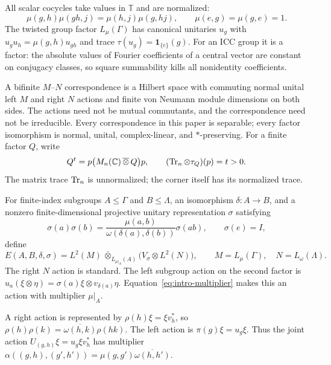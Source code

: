 All scalar cocycles take values in $\mathbb T$ and are normalized:
\[
 \mu(g,h)\mu(gh,j)=\mu(h,j)\mu(g,hj),\qquad
 \mu(e,g)=\mu(g,e)=1.
\]
The twisted group factor $L_\mu(\Gamma)$ has canonical unitaries $u_g$
with $u_gu_h=\mu(g,h)u_{gh}$ and trace
$\tau(u_g)=\mathbf1_{\{e\}}(g)$. For an ICC group it is a factor: the
absolute values of Fourier coefficients of a central vector are constant
on conjugacy classes, so square summability kills all nonidentity
coefficients.

A bifinite $M$--$N$ correspondence is a Hilbert space with commuting normal
unital left $M$ and right $N$ actions and finite von Neumann module
dimensions on both sides. The actions need not be mutual commutants, and
the correspondence need not be irreducible. Every correspondence in this
paper is separable; every factor isomorphism is normal, unital,
complex-linear, and $*$-preserving. For a finite factor $Q$, write
\[
 Q^t=p\bigl(M_n(\mathbb C)\,\overline\otimes\,Q\bigr)p,
 \qquad (\operatorname{Tr}_n\otimes\tau_Q)(p)=t>0.
\]
The matrix trace $\operatorname{Tr}_n$ is unnormalized; the corner itself has its
normalized trace.


For finite-index subgroups $A\leq\Gamma$ and $B\leq\Lambda$, an
isomorphism $\delta:A\to B$, and a nonzero finite-dimensional projective
unitary representation $\sigma$ satisfying
\begin{equation}\label{eq:intro-multiplier}
 \sigma(a)\sigma(b)
 =\frac{\mu(a,b)}{\omega(\delta(a),\delta(b))}\sigma(ab),
 \qquad \sigma(e)=I,
\end{equation}
define
\begin{equation}\label{eq:intro-model}
 E(A,B,\delta,\sigma)
 =L^2(M)\,\overline\otimes_{L_{\mu|_A}(A)}
       \bigl(V_\sigma\otimes L^2(N)\bigr),
 \qquad M=L_\mu(\Gamma),\quad N=L_\omega(\Lambda).
\end{equation}
The right $N$ action is standard. The left subgroup action on the second
factor is
$u_a(\xi\otimes\eta)=\sigma(a)\xi\otimes v_{\delta(a)}\eta$.
Equation~\eqref{eq:intro-multiplier} makes this an action with multiplier
$\mu|_A$.


A right action is represented by $\rho(h)\xi=\xi v_h^*$, so
$\rho(h)\rho(k)=\overline{\omega(h,k)}\rho(hk)$.
The left action is $\pi(g)\xi=u_g\xi$.  Thus the joint action
$U_{(g,h)}\xi=u_g\xi v_h^*$ has multiplier
$\alpha((g,h),(g',h'))=\mu(g,g')\overline{\omega(h,h')}$.

